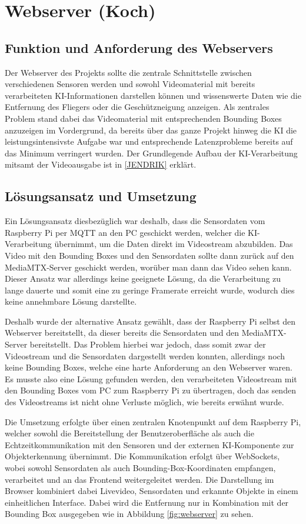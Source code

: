 \chapter{Webserver (Koch)}
\label{sec:Webserver}
\section{Funktion und Anforderung des Webservers}
Der Webserver des Projekts sollte die zentrale Schnittstelle zwischen verschiedenen Sensoren werden und sowohl Videomaterial mit bereits verarbeiteten KI-Informationen darstellen können und wissenswerte Daten wie die Entfernung des Fliegers oder die Geschützneigung anzeigen.
Als zentrales Problem stand dabei das Videomaterial mit entsprechenden Bounding Boxes anzuzeigen im Vordergrund, da bereits über das ganze Projekt hinweg die KI die leistungsintensivste Aufgabe war und entsprechende Latenzprobleme bereits auf das Minimum verringert wurden.
Der Grundlegende Aufbau der KI-Verarbeitung mitsamt der Videoausgabe ist in \ref{JENDRIK} erklärt.

\section{Lösungsansatz und Umsetzung}
Ein Lösungsansatz diesbezüglich war deshalb, dass die Sensordaten vom Raspberry Pi per MQTT an den PC geschickt werden, welcher die KI-Verarbeitung übernimmt, um die Daten direkt im Videostream abzubilden.
Das Video mit den Bounding Boxes und den Sensordaten sollte dann zurück auf den MediaMTX-Server geschickt werden, worüber man dann das Video sehen kann.
Dieser Ansatz war allerdings keine geeignete Lösung, da die Verarbeitung zu lange dauerte und somit eine zu geringe Framerate erreicht wurde, wodurch dies keine annehmbare Lösung darstellte.


Deshalb wurde der alternative Ansatz gewählt, dass der Raspberry Pi selbst den Webserver bereitstellt, da dieser bereits die Sensordaten und den MediaMTX-Server bereitstellt.
Das Problem hierbei war jedoch, dass somit zwar der Videostream und die Sensordaten dargestellt werden konnten, allerdings noch keine Bounding Boxes, welche eine harte Anforderung an den Webserver waren.
Es musste also eine Lösung gefunden werden, den verarbeiteten Videostream mit den Bounding Boxes vom PC zum Raspberry Pi zu übertragen, doch das senden des Videostreams ist nicht ohne Verluste möglich, wie bereits erwähnt wurde.

Die Umsetzung erfolgte über einen zentralen Knotenpunkt auf dem Raspberry Pi, welcher sowohl die Bereitstellung der Benutzeroberfläche als auch die Echtzeitkommunikation mit den Sensoren und der externen KI-Komponente zur Objekterkennung übernimmt. Die Kommunikation erfolgt über WebSockets, wobei sowohl Sensordaten als auch Bounding-Box-Koordinaten empfangen, verarbeitet und an das Frontend weitergeleitet werden. Die Darstellung im Browser kombiniert dabei Livevideo, Sensordaten und erkannte Objekte in einem einheitlichen Interface. 
Dabei wird die Entfernung nur in Kombination mit der Bounding Box ausgegeben wie in Abbildung \ref{fig:webserver} zu sehen.

